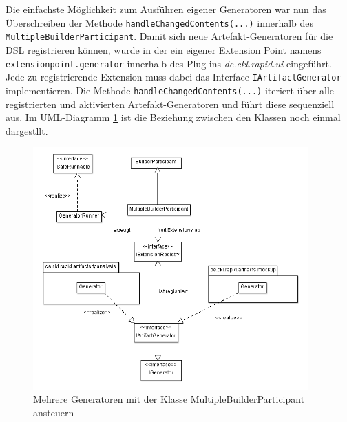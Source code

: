 \documentclass[a4paper,12pt]{scrreprt}
\begin{document}
\\
\\
Die einfachste Möglichkeit zum Ausführen eigener Generatoren war nun das Überschreiben der Methode  \verb+handleChangedContents(...)+ innerhalb des\\
\verb+MultipleBuilderParticipant+.
Damit sich neue Artefakt-Generatoren für die DSL registrieren können, wurde in der  ein eigener Extension Point namens \verb+extensionpoint.generator+ innerhalb des Plug-ins \textit{de.ckl.rapid.ui} eingeführt. Jede zu registrierende Extension muss dabei das Interface \verb+IArtifactGenerator+ implementieren.
Die Methode \verb+handleChangedContents(...)+ iteriert über alle registrierten und aktivierten Artefakt-Generatoren und führt diese sequenziell aus. Im UML-Diagramm \ref{fig:builder-participant} ist die Beziehung zwischen den Klassen noch einmal dargestllt.
\begin{figure}[h]
	\centering
		\includegraphics[width=400px]{diagramme/builder-participant.png}
		\caption{Mehrere Generatoren mit der Klasse MultipleBuilderParticipant ansteuern}
		\label{fig:builder-participant}
\end{figure}
\end{document}

